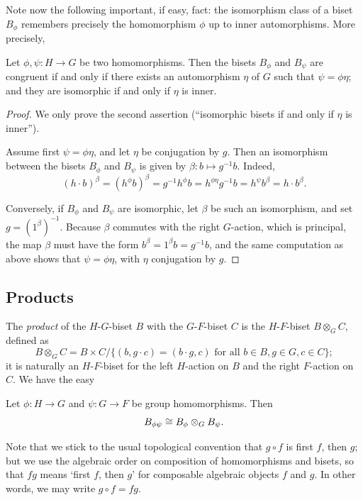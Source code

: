 \documentclass{amsart}
\begin{document}
Note now the following important, if easy, fact: the isomorphism class
of a biset $B_\phi$ remembers precisely the homomorphism $\phi$ up to
inner automorphisms. More precisely,
\begin{lem}
  Let $\phi,\psi\colon H\to G$ be two homomorphisms. Then the bisets
  $B_\phi$ and $B_\psi$ are congruent if and only if there exists an
  automorphism $\eta$ of $G$ such that $\psi=\phi\eta$; and they are
  isomorphic if and only if $\eta$ is inner.
\end{lem}
\begin{proof}
  We only prove the second assertion (``isomorphic bisets if and only
  if $\eta$ is inner'').

  Assume first $\psi=\phi\eta$, and let $\eta$ be conjugation by
  $g$. Then an isomorphism between the bisets $B_\phi$ and $B_\psi$ is
  given by $\beta\colon b\mapsto g^{-1}b$. Indeed,
  \[(h\cdot b)^\beta=(h^\phi b)^\beta=g^{-1}h^\phi b=h^{\phi\eta}g^{-1}b=h^\psi b^\beta=h\cdot b^\beta.\]

  Conversely, if $B_\phi$ and $B_\psi$ are isomorphic, let $\beta$ be
  such an isomorphism, and set $g=(1^\beta)^{-1}$. Because $\beta$
  commutes with the right $G$-action, which is principal, the map
  $\beta$ must have the form $b^\beta=1^\beta b=g^{-1}b$, and the
  same computation as above shows that $\psi=\phi\eta$, with $\eta$
  conjugation by $g$.
\end{proof}

\subsection{Products}
The \emph{product} of the $H$-$G$-biset $B$ with the $G$-$F$-biset
$C$ is the $H$-$F$-biset $B\otimes_G C$, defined as
\[B\otimes_G C=B\times C\big/\{(b,g\cdot c)=(b\cdot g,c)\text{ for all }b\in
B,g\in G,c\in C\};
\]
it is naturally an $H$-$F$-biset for the left $H$-action on $B$
and the right $F$-action on $C$. We have the easy
\begin{lem}\pushQED{\qed}
  Let $\phi\colon H\to G$ and $\psi\colon G\to F$ be group homomorphisms. Then
  \[B_{\phi\psi} \cong B_{\phi}\otimes_G B_\psi.\qedhere\]
\end{lem}
Note that we stick to the usual topological convention that $g\circ f$
is first $f$, then $g$; but we use the algebraic order on composition
of homomorphisms and bisets, so that $f g$ means `first $f$, then $g$'
for composable algebraic objects $f$ and $g$. In other words, we may
write $g\circ f=f g$.
\end{document}
